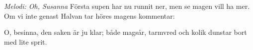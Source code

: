 {\footnotesize\textit{Melodi: Oh, Susanna}}
\vspace{10pt}
Första supen har nu runnit ner,
men se magen vill ha mer.
Om vi inte genast Halvan tar
höres magens kommentar:

O, besinna, den saken är ju klar;
både magsår, tarmvred och kolik
dunstar bort med lite sprit.
